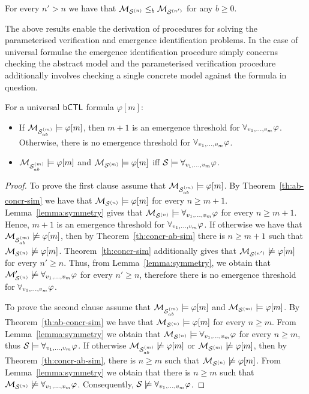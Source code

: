 \begin{theorem}
\label{th:concr-sim}
For every $n' > n$ we have that $\mathcal{M}_{\mathcal{S}^{(n)}} \leq_b \mathcal{M}_{\mathcal{S}^{(n')}}$ for any
$b \geq 0$.
\end{theorem}

The above results enable the derivation of procedures for solving
the parameterised verification and emergence identification problems. In the case
of universal formulae the emergence identification procedure simply concerns
checking the abstract model and the parameterised verification procedure 
additionally involves checking a single concrete model against the formula in
question.

\begin{corollary}
\label{cor:universal}
For a universal $\sf{bCTL}$ formula $\varphi[m]$:
\begin{itemize}[$\bullet$]
    \item  If $\mathcal{M}_{\mathcal{S}_{ab}^{(m)}} \models \varphi[m]$, then $m + 1$ is an emergence
    threshold for $\forall_{v_1,\ldots,v_m} \varphi$. Otherwise, there is no emergence threshold for
    $\forall_{v_1,\ldots,v_m} \varphi$.
    \item $\mathcal{M}_{\mathcal{S}_{ab}^{(m)}} \models \varphi[m]$ and $\mathcal{M}_{\mathcal{S}^{(m)}} \models \varphi[m]$ iff
    $\mathcal S \models \forall_{v_1,\ldots,v_m} \varphi$.
\end{itemize}
\end{corollary}
\begin{proof}
To prove the first clause assume that $\mathcal{M}_{\mathcal{S}_{ab}^{(m)}} \models \varphi[m]$. By
Theorem~\ref{th:ab-concr-sim} we have that $\mathcal{M}_{\mathcal{S}^{(n)}} \models \varphi[m]$ for
every $n \geq m+1$. Lemma~\ref{lemma:symmetry} gives that  $\mathcal{M}_{\mathcal{S}^{(n)}} \models
\forall_{v_1,\ldots,v_m} \varphi$ for every $n \geq m+1$. Hence, $m+1$ is an emergence threshold for
$\forall_{v_1,\ldots,v_m} \varphi$. If otherwise we have that  $\mathcal{M}_{\mathcal{S}_{ab}^{(m)}} \not \models \varphi[m]$,
then by Theorem~\ref{th:concr-ab-sim} there is $n \geq m+1$ such that $\mathcal{M}_{\mathcal{S}^{(n)}}
\not \models \varphi[m]$. Theorem~\ref{th:concr-sim} additionally gives that
$\mathcal{M}_{\mathcal{S}^{(n')}} \not \models \varphi[m]$ for every $n' \geq n$. Thus, from
Lemma~\ref{lemma:symmetry}, we obtain that $\mathcal{M}_{\mathcal{S}^{(n)}}' \not \models \forall_{v_1,\ldots,v_m} \varphi$
for every $n' \geq n$, therefore there is no emergence threshold for
$\forall_{v_1,\ldots,v_m} \varphi$.

To prove the second clause assume that $\mathcal{M}_{\mathcal{S}_{ab}^{(m)}} \models \varphi[m]$ and $\mathcal{M}_{\mathcal{S}^{(m)}} \models \varphi[m]$. By Theorem~\ref{th:ab-concr-sim} we have that $\mathcal{M}_{\mathcal{S}^{(n)}}
\models \varphi[m]$ for every $n \geq m$. From Lemma~\ref{lemma:symmetry} we
obtain that $\mathcal{M}_{\mathcal{S}^{(n)}} \models \forall_{v_1,\ldots,v_m} \varphi$ for every $n \geq m$, thus $\mathcal S
\models \forall_{v_1,\ldots,v_m} \varphi$. If otherwise $\mathcal{M}_{\mathcal{S}_{ab}^{(m)}} \not \models \varphi[m]$ or $\mathcal{M}_{\mathcal{S}^{(m)}}
\not \models \varphi[m]$, then by Theorem~\ref{th:concr-ab-sim}, there is $n
\geq m$ such that $\mathcal{M}_{\mathcal{S}^{(n)}} \not \models \varphi[m]$.  From
Lemma~\ref{lemma:symmetry} we obtain that there is $n \geq m$ such that $\mathcal{M}_{\mathcal{S}^{(n)}}
\not \models \forall_{v_1,\ldots,v_m} \varphi$. Consequently, $\mathcal S \not \models \forall_{v_1,\ldots,v_m} \varphi$.
\end{proof}

